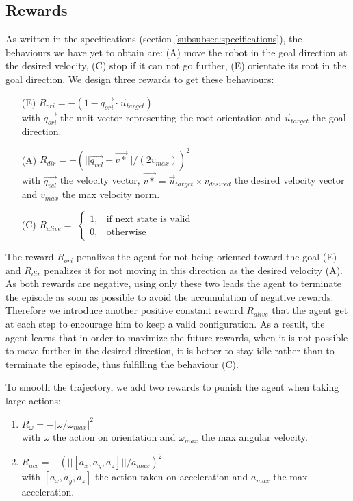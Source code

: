 \subsection{Rewards}
As written in the specifications (section \ref{subsubsec:specifications}), the behaviours we have yet to obtain are: (A) move the robot in the goal direction at the desired velocity, (C) stop if it can not go further, (E) orientate its root in the goal direction. 
We design three rewards to get these behaviours:
\begin{enumerate}
  \item[(E)] $R_{ori} = -( 1 -  \overrightarrow{q_{ori}} \cdot \overrightarrow{u}_{target} )$ \\
  with $\overrightarrow{q_{ori}}$ the unit vector representing the root orientation and $\overrightarrow{u}_{target}$ the goal direction.
  \item[(A)] $R_{dir} = -( ||\overrightarrow{q_{vel}} - \overrightarrow{v*} ||/(2v_{max}) )^2$ \\
  with $\overrightarrow{q_{vel}}$ the velocity vector, $\overrightarrow{v*}=\overrightarrow{u}_{target} \times v_{desired}$ the desired velocity vector and $v_{max}$ the max velocity norm.
  \item[(C)] $R_{alive} = $ 
    $
    \begin{cases}
      1, & \text{if next state is valid} \\
      0, & \text{otherwise}
    \end{cases}
    $
\end{enumerate}
The reward $R_{ori}$ penalizes the agent for not being oriented toward the goal (E) and $R_{dir}$ penalizes it for not moving in this direction as the desired velocity (A). 
As both rewards are negative, using only these two leads the agent to terminate the episode as soon as possible to avoid the accumulation of negative rewards. 
Therefore we introduce another positive constant reward $R_{alive}$ that the agent get at each step to encourage him to keep a valid configuration. 
As a result, the agent learns that in order to maximize the future rewards, when it is not possible to move further in the desired direction, it is better to stay idle rather than to terminate the episode, thus fulfilling the behaviour (C).

To smooth the trajectory, we add two rewards to punish the agent when taking large actions:
\begin{enumerate}
    \item $R_{\omega} = - | \omega / \omega_{max} |^2 $ \\
    with $\omega$ the action on orientation and $\omega_{max}$ the max angular velocity.
    \item $R_{acc} = - (|| [a_{x},a_{y},a_{z}] || / a_{max})^2 $ \\
    with $[a_{x},a_{y},a_{z}]$ the action taken on acceleration and $a_{max}$ the max acceleration.
\end{enumerate}


